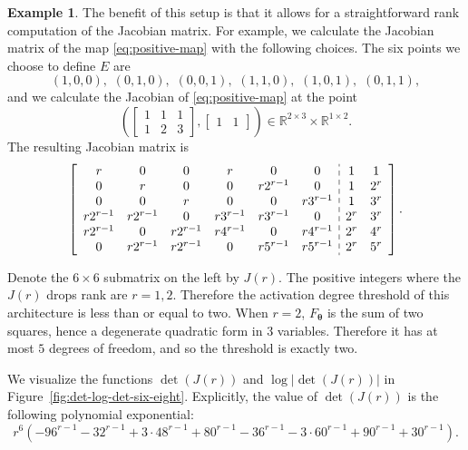 \documentclass[12pt]{article}
\theoremstyle{definition}
\newtheorem{example}[theorem]{Example}
\newcommand{\btheta}{{\boldsymbol{\theta}}}
\begin{document}
\begin{example}
The benefit of this setup is that it
allows for a straightforward rank computation of the Jacobian matrix.
For example, we calculate the Jacobian matrix of the map \eqref{eq:positive-map} with the following choices.  
The six points we choose to define $E$
are 
\[(1, 0, 0), \,\, (0, 1, 0),\,\, (0, 0, 1),\,\, (1, 1, 0),\,\, (1, 0, 1),\,\, (0, 1, 1),\] 
and  we  calculate the Jacobian of \eqref{eq:positive-map}
at the point
\[\left(\left[\begin{array}{ccc}1 & 1 & 1\\1& 2 & 3\end{array}\right], \left[\begin{array}{cc}1 & 1\end{array}\right]\right)\in \mathbb{R}^{2\times 3}\times \mathbb{R}^{1\times 2}.\]
The resulting 
Jacobian matrix is 
\begin{equation}\label{eq:six-eight-jacobian}
\left[\begin{array}{cccccc;{4pt/3pt}cc}
r&0&0&r&0&0 &1&1\\
0&r&0&0&r2^{r-1}&0 &1&2^r\\
0&0&r&0&0&r3^{r-1} &1&3^r\\
r2^{r-1}&r2^{r-1}&0&r3^{r-1}&r3^{r-1}&0 &2^r&3^r\\
r2^{r-1}&0&r2^{r-1}&r4^{r-1}&0&r4^{r-1} &2^r&4^r\\
0&r2^{r-1}&r2^{r-1}&0&r5^{r-1}&r5^{r-1} &2^r&5^r\\
\end{array}\right].
\end{equation}

Denote the $6\times 6 $ submatrix on the left by $J(r)$.
The positive integers where the $J(r)$ drops rank are $r=1,2$. Therefore the activation degree threshold of this architecture is less than or equal to two. 
When $r=2$, $F_\btheta$ is the sum of two squares, hence a degenerate quadratic form in $3$ variables. Therefore it has at most $5$ degrees of freedom, and so the threshold is exactly two.

We visualize the functions $\det(J(r))$ and $\log|\det(J(r))|$   in Figure~\ref{fig:det-log-det-six-eight}. Explicitly, the value of $\det(J(r))$ is the following polynomial exponential:
    \begin{equation}\label{eq:det-six-six}
    r^6 \left(-96^{r-1}-32^{r-1}+3\cdot 48^{r-1}+80^{r-1}-36^{r-1}-3\cdot 60^{r-1}+90^{r-1}+30^{r-1}\right).
        \end{equation}



\end{example}
\end{document}

